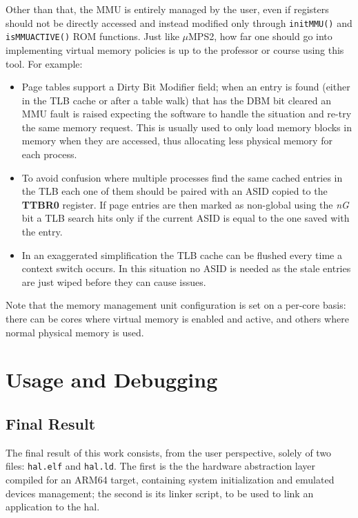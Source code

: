 \documentclass[12pt,a4paper,openright,twoside]{report}
\begin{document}
Other than that, the MMU is entirely managed by the user, even if
registers should not be directly accessed and instead modified only through 
{\tt initMMU()} and {\tt isMMUACTIVE()} ROM functions.
Just like $\mu$MPS2, how far one should go into implementing virtual 
memory policies is up to the professor or course using this tool. For
example:
\begin{itemize}
    \item Page tables support a Dirty Bit Modifier field; when an entry is found
        (either in the TLB cache or after a table walk) that has the DBM bit 
        cleared an MMU fault is raised expecting the software to handle the
        situation and re-try the same memory request. This is usually used 
        to only load memory blocks in memory when they are accessed, thus
        allocating less physical memory for each process.
    \item To avoid confusion where multiple processes find the same cached entries
        in the TLB each one of them should be paired with an ASID copied to the
        \textbf{TTBR0} register. If page entries are then marked as non-global
        using the \textit{nG} bit a TLB search hits only if the current ASID is equal
        to the one saved with the entry.
    \item In an exaggerated simplification the TLB cache can be flushed every time
        a context switch occurs. In this situation no ASID is needed as the stale
        entries are just wiped before they can cause issues.
\end{itemize}

Note that the memory management unit configuration is set on a per-core basis:
there can be cores where virtual memory is enabled and active, and others where
normal physical memory is used.


\clearpage{\pagestyle{empty}\cleardoublepage}
\chapter{Usage and Debugging}
\section{Final Result}
The final result of this work consists, from the user perspective, solely of 
two files: {\tt hal.elf} and {\tt hal.ld}.
The first is the the hardware abstraction layer compiled for an ARM64 target, 
containing system initialization and emulated devices management; the second is 
its linker script, to be used to link an application to the hal.
\end{document}
